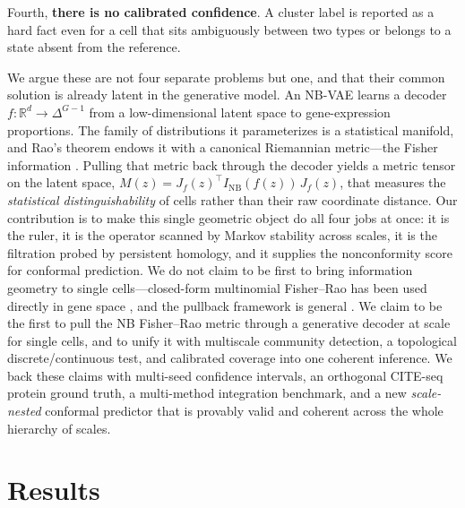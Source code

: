 \documentclass[11pt]{article}
\begin{document}
Fourth, \textbf{there is no calibrated confidence}. A cluster label is reported as a hard fact even
for a cell that sits ambiguously between two types or belongs to a state absent from the reference.

We argue these are not four separate problems but one, and that their common solution is already
latent in the generative model. An NB-VAE learns a decoder $f:\mathbb{R}^d\!\to\!\Delta^{G-1}$ from a
low-dimensional latent space to gene-expression proportions. The family of distributions it
parameterizes is a statistical manifold, and Rao's theorem endows it with a canonical Riemannian
metric---the Fisher information \citep{rao1945information,amari2000methods}. Pulling that metric back
through the decoder \citep{arvanitidis2022pulling} yields a metric tensor on the latent space,
$M(z)=J_f(z)^{\!\top} I_{\mathrm{NB}}(f(z))\,J_f(z)$, that measures the \emph{statistical
distinguishability} of cells rather than their raw coordinate distance. Our contribution is to make
this single geometric object do all four jobs at once: it is the ruler, it is the operator scanned by
Markov stability across scales, it is the filtration probed by persistent homology, and it supplies
the nonconformity score for conformal prediction. We do not claim to be first to bring information
geometry to single cells---closed-form multinomial Fisher--Rao has been used directly in gene space
\citep{cai2025gaia}, and the pullback framework is general \citep{arvanitidis2022pulling}. We claim to
be the first to pull the NB Fisher--Rao metric through a generative decoder at scale for single cells,
and to unify it with multiscale community detection, a topological discrete/continuous test, and
calibrated coverage into one coherent inference. We back these claims with multi-seed confidence
intervals, an orthogonal CITE-seq protein ground truth, a multi-method integration benchmark, and a
new \emph{scale-nested} conformal predictor that is provably valid and coherent across the whole
hierarchy of scales.

\section{Results}
\end{document}
